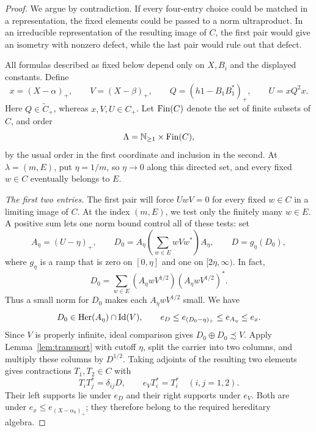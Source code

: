 \begin{proof}
We argue by contradiction.  If every four-entry choice could be
matched in a representation, the fixed elements could be passed to
a norm ultraproduct.  In an irreducible representation of the
resulting image of \(C\), the first pair would give an isometry with
nonzero defect, while the last pair would rule out that defect.

All formulas described as fixed below depend only on \(X,B_i\)
and the displayed constants.  Define
\begin{equation}\label{eq:four-first-fixed}
 x=(X-\alpha)_+,\qquad V=(X-\beta)_+,\qquad
 Q=(h1-B_1B_1^*)_+,\qquad U=xQ^2x.
\end{equation}
Here \(Q\in\widetilde C_+\), whereas \(x,V,U\in C_+\).
Let \(\operatorname{Fin}(C)\) denote the set of finite subsets of \(C\), and order
\[
 \Lambda=\mathbb N_{\ge1}\times\operatorname{Fin}(C),
\]
by the usual order in the first coordinate and inclusion in the
second.  At \(\lambda=(m,E)\), put \(\eta=1/m\), so
\(\eta\to0\) along this directed set, and every fixed \(w\in C\)
eventually belongs to \(E\).

\medskip\noindent\emph{The first two entries.}
The first pair will force \(UwV=0\) for every fixed \(w\in C\)
in a limiting image of \(C\).  At the index \((m,E)\), we test
only the finitely many \(w\in E\).  A positive sum lets one norm
bound control all of these tests: set
\begin{equation}\label{eq:four-D}
 A_\eta=(U-\eta)_+,\qquad
 D_0=A_\eta\left(\sum_{w\in E}wVw^*\right)A_\eta,\qquad
 D=g_\eta(D_0),
\end{equation}
where \(g_\eta\) is a ramp that is zero on \([0,\eta]\) and
one on \([2\eta,\infty)\).  In fact,
\[
 D_0=\sum_{w\in E}
 (A_\eta wV^{1/2})(A_\eta wV^{1/2})^*.
\]
Thus a small norm for \(D_0\) makes each
\(A_\eta wV^{1/2}\) small.  We have
\[
 D_0\in\operatorname{Her}(A_\eta)\cap\operatorname{Id}(V),\qquad
 e_D\le e_{(D_0-\eta)_+}\le e_{A_\eta}\le e_x.
\]
Since \(V\) is properly infinite, ideal comparison gives
\(D_0\oplus D_0\precsim V\).  Apply
Lemma~\ref{lem:transport} with cutoff \(\eta\), split the
carrier into two columns, and multiply these columns by
\(D^{1/2}\).  Taking adjoints of the resulting two elements gives
contractions \(T_1,T_2\in C\) with
\begin{equation}\label{eq:four-first-entries}
 T_iT_j^*=\delta_{ij}D,\qquad e_VT_i^*=T_i^*
 \quad(i,j=1,2).
\end{equation}
Their left supports lie under \(e_D\) and their right supports
under \(e_V\).  Both are under \(e_x\le e_{(X-\alpha_0)_+}\);
they therefore belong to the required hereditary algebra.


\end{proof}
